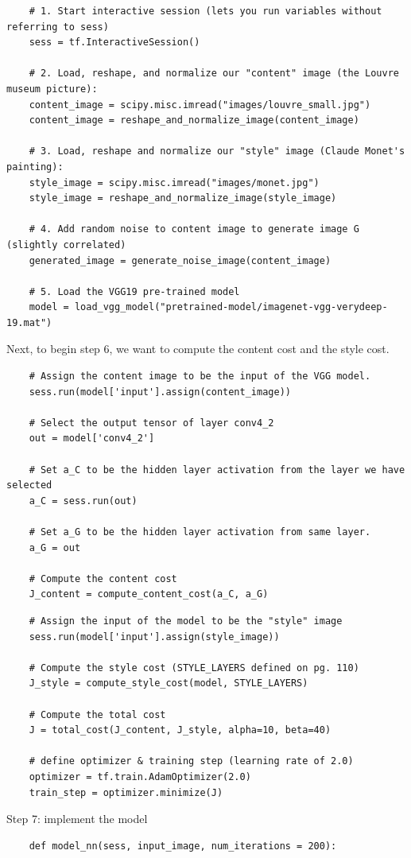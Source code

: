 \documentclass[11pt, a4paper]{article}
\begin{document}
\begin{spacing}{1.1}
\begin{lstlisting}
	# 1. Start interactive session (lets you run variables without referring to sess)
	sess = tf.InteractiveSession()
	
	# 2. Load, reshape, and normalize our "content" image (the Louvre museum picture):
	content_image = scipy.misc.imread("images/louvre_small.jpg")
	content_image = reshape_and_normalize_image(content_image)
	
	# 3. Load, reshape and normalize our "style" image (Claude Monet's painting):
	style_image = scipy.misc.imread("images/monet.jpg")
	style_image = reshape_and_normalize_image(style_image)
	
	# 4. Add random noise to content image to generate image G (slightly correlated)
	generated_image = generate_noise_image(content_image)
	
	# 5. Load the VGG19 pre-trained model
	model = load_vgg_model("pretrained-model/imagenet-vgg-verydeep-19.mat")	\end{lstlisting} \vspace*{1mm}
	Next, to begin step 6, we want to compute the content cost and the style cost. 
	\begin{lstlisting}
	# Assign the content image to be the input of the VGG model.  
	sess.run(model['input'].assign(content_image))
	
	# Select the output tensor of layer conv4_2
	out = model['conv4_2']
	
	# Set a_C to be the hidden layer activation from the layer we have selected
	a_C = sess.run(out)
	
	# Set a_G to be the hidden layer activation from same layer.
	a_G = out
	
	# Compute the content cost
	J_content = compute_content_cost(a_C, a_G)	\end{lstlisting} \newpage

	\begin{lstlisting}
	# Assign the input of the model to be the "style" image 
	sess.run(model['input'].assign(style_image))
	
	# Compute the style cost (STYLE_LAYERS defined on pg. 110)
	J_style = compute_style_cost(model, STYLE_LAYERS) 
	
	# Compute the total cost
	J = total_cost(J_content, J_style, alpha=10, beta=40)
	
	# define optimizer & training step (learning rate of 2.0)
	optimizer = tf.train.AdamOptimizer(2.0)
	train_step = optimizer.minimize(J)	\end{lstlisting} \vspace*{1mm}
	Step 7: implement the model
	\begin{lstlisting}
	def model_nn(sess, input_image, num_iterations = 200):
	

\end{lstlisting}
\end{spacing}
\end{document}
